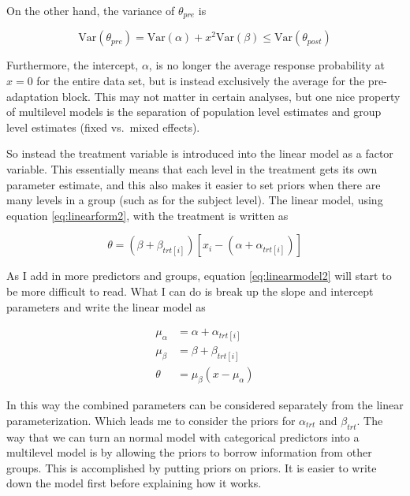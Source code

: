 \documentclass[11pt, oneside, openany]{scrbook}
\begin{document}
On the other hand, the variance of \(\theta_{pre}\) is


\[
\mathrm{Var}(\theta_{pre}) = \mathrm{Var}(\alpha) + x^2 \mathrm{Var}(\beta) \le \mathrm{Var}(\theta_{post})
\]

Furthermore, the intercept, \(\alpha\), is no longer the average response probability at \(x=0\) for the entire data set, but is instead exclusively the average for the pre-adaptation block. This may not matter in certain analyses, but one nice property of multilevel models is the separation of population level estimates and group level estimates (fixed vs.~mixed effects).

So instead the treatment variable is introduced into the linear model as a factor variable. This essentially means that each level in the treatment gets its own parameter estimate, and this also makes it easier to set priors when there are many levels in a group (such as for the subject level). The linear model, using equation \eqref{eq:linearform2}, with the treatment is written as


\begin{equation}
  \theta = (\beta + \beta_{trt[i]}) \left[x_i - (\alpha + \alpha_{trt[i]})\right]
  \label{eq:linearmodel2}
\end{equation}

As I add in more predictors and groups, equation \eqref{eq:linearmodel2} will start to be more difficult to read. What I can do is break up the slope and intercept parameters and write the linear model as


\begin{align*}
\mu_\alpha &= \alpha + \alpha_{trt[i]} \\
\mu_\beta &= \beta + \beta_{trt[i]} \\
\theta &= \mu_\beta (x - \mu_\alpha)
\end{align*}

In this way the combined parameters can be considered separately from the linear parameterization. Which leads me to consider the priors for \(\alpha_{trt}\) and \(\beta_{trt}\). The way that we can turn an normal model with categorical predictors into a multilevel model is by allowing the priors to borrow information from other groups. This is accomplished by putting priors on priors. It is easier to write down the model first before explaining how it works.
\end{document}
